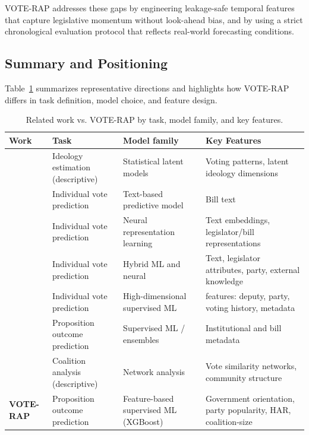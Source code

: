 \documentclass[review]{elsarticle}
\begin{document}
VOTE-RAP addresses these gaps by engineering leakage-safe temporal features that capture legislative momentum without look-ahead bias, and by using a strict chronological evaluation protocol that reflects real-world forecasting conditions.

\subsection{Summary and Positioning}

Table~\ref{tab:related_work_comparison} summarizes representative directions and highlights how VOTE-RAP differs in task definition, model choice, and feature design.

\begin{table}[H]
\caption{Related work vs. VOTE-RAP by task, model family, and key features.}


\centering
\small
\setlength{\tabcolsep}{3pt}
\renewcommand{\arraystretch}{1.15}
\begin{tabular}{|>{\centering\arraybackslash}m{3.6cm}|
                >{\centering\arraybackslash}m{2.6cm}|
                >{\centering\arraybackslash}m{2.8cm}|
                >{\centering\arraybackslash}m{3.6cm}|}
\hline
\textbf{Work} & \textbf{Task} & \textbf{Model family} & \textbf{Key Features} \\ \hline
\citep{Poole1985,Clinton2004} & Ideology estimation (descriptive) & Statistical latent models & Voting patterns, latent ideology dimensions \\ \hline
\citep{Gerrish2011} & Individual vote prediction & Text-based predictive model & Bill text \\ \hline
\citep{Kraft2021,Patil2020,Feng2022PAR} & Individual vote prediction & Neural representation learning & Text embeddings, legislator/bill representations \\ \hline
\citep{Kornilova2018,Cheng2017,MultiFactor2019} & Individual vote prediction & Hybrid ML and neural & Text, legislator attributes, party, external knowledge \\ \hline
\citep{Albuquerque2025Forecasting} & Individual vote prediction & High-dimensional supervised ML & 219 features: deputy, party, voting history, metadata \\ \hline
\citep{Bari2021AIBillPassageUS} & Proposition outcome prediction & Supervised ML / ensembles & Institutional and bill metadata \\ \hline
\citep{Brito2020,Ferreira2021,Cherepnalkoski2022,Arinik2020} & Coalition analysis (descriptive) & Network analysis & Vote similarity networks, community structure \\ \hline
\textbf{VOTE-RAP} & Proposition outcome prediction & Feature-based supervised ML (XGBoost) & Government orientation, party popularity, HAR, coalition-size \\ \hline
\end{tabular}
\label{tab:related_work_comparison}
\normalsize
\end{table}
\end{document}
